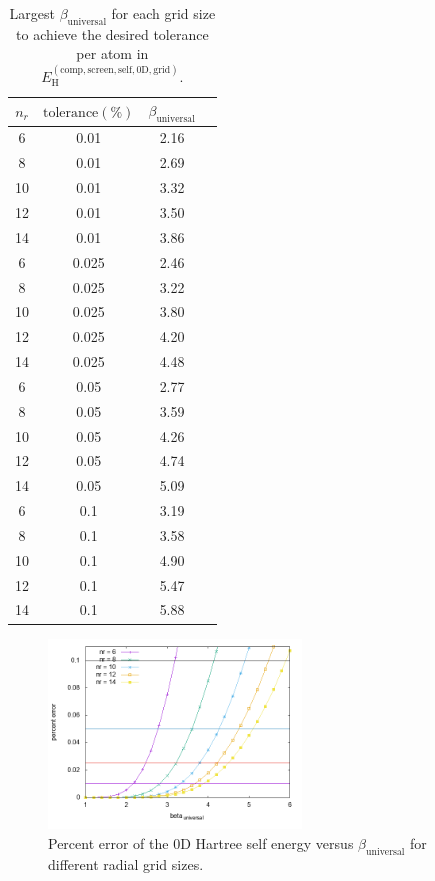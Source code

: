 \documentclass[paper=a4, fontsize=11pt]{article} %
\numberwithin{equation}{section} %
\numberwithin{figure}{section} %
\numberwithin{table}{section} %
\newcommand{\rH}{{\mathrm{H}}}
\newcommand{\rcomp}{{\mathrm{comp}}}
\begin{document}
\begin{table}[!htbp]
\caption{\label{index} Largest $\beta_{\mathrm{universal}}$ for each grid size to achieve the desired tolerance per atom in $E_{\rH}^{(\rcomp,\mathrm{screen, self, 0D, grid})}$.}
\begin{center}
\begin{tabular}{ c  c  c  c}
  \hline\hline
   $n_r$ & $\mathrm{tolerance} (\%)$ & $\beta_{\mathrm{universal}}$ \\
   \hline
    6 & 0.01 & 2.16\\
    8 & 0.01 & 2.69\\
    10 & 0.01 & 3.32\\
    12 & 0.01 & 3.50\\
    14 & 0.01 & 3.86\\ \hline
    6 & 0.025 & 2.46\\
    8 & 0.025 & 3.22\\
    10 & 0.025 & 3.80\\
    12 & 0.025 & 4.20\\
    14 & 0.025 & 4.48\\ \hline
    6 & 0.05 & 2.77\\
    8 & 0.05 & 3.59\\
    10 & 0.05 & 4.26\\
    12 & 0.05 & 4.74\\
    14 & 0.05 & 5.09\\ \hline
    6 & 0.1 & 3.19\\
    8 & 0.1 & 3.58\\
    10 & 0.1 & 4.90\\
    12 & 0.1 & 5.47\\
    14 & 0.1 & 5.88\\
  \hline\hline
\end{tabular}
\end{center}
\end{table}

\begin{figure}[!htbp] 
    \centering
    \includegraphics[width=0.6\textwidth]{error}
    \caption{Percent error of the 0D Hartree self energy versus $\beta_{\mathrm{universal}}$ for different radial grid sizes.} 
    \label{fig:error}
\end{figure}
\end{document}
